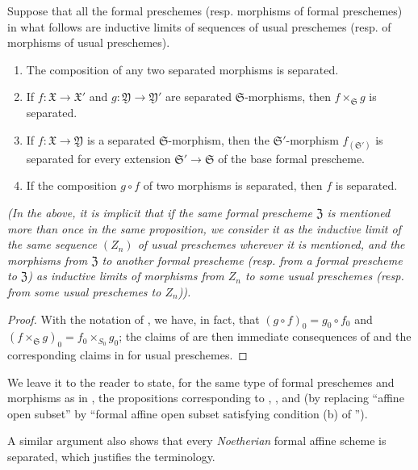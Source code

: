 \begin{proposition}[10.15.3]
\label{I.10.15.3}
Suppose that all the formal preschemes (resp. morphisms of formal preschemes) in what follows are inductive limits of sequences of usual preschemes (resp. of morphisms of usual preschemes).
\begin{enumerate}
    \item[\rm{(i)}] The composition of any two separated morphisms is separated.
    \item[\rm{(ii)}] If $f:\mathfrak{X}\to\mathfrak{X}'$ and $g:\mathfrak{Y}\to\mathfrak{Y}'$ are separated $\mathfrak{S}$-morphisms, then $f\times_\mathfrak{S}g$ is separated.
    \item[\rm{(iii)}] If $f:\mathfrak{X}\to\mathfrak{Y}$ is a separated $\mathfrak{S}$-morphism, then the $\mathfrak{S}'$-morphism $f_{(\mathfrak{S}')}$ is separated for every extension $\mathfrak{S}'\to\mathfrak{S}$ of the base formal prescheme.
    \item[\rm{(iv)}] If the composition $g\circ f$ of two morphisms is separated, then $f$ is separated.
\end{enumerate}
\emph{(In the above, it is implicit that if the same formal prescheme $\mathfrak{Z}$ is mentioned more than once in the same proposition, we consider it as the inductive limit of the \emph{same} sequence $(Z_n)$ of usual preschemes wherever it is mentioned, and the morphisms from $\mathfrak{Z}$ to another formal prescheme (resp. from a formal prescheme to $\mathfrak{Z}$) as inductive limits of morphisms from $Z_n$ to some usual preschemes (resp. from some usual preschemes to $Z_n$)).}
\end{proposition}

\begin{proof}
With the notation of , we have, in fact, that $(g\circ f)_0=g_0\circ f_0$ and $(f\times_\mathfrak{S}g)_0=f_0\times_{S_0}g_0$;
the claims of  are then immediate consequences of  and the corresponding claims in  for usual preschemes.
\end{proof}

We leave it to the reader to state, for the same type of formal preschemes and morphisms as in , the propositions corresponding to ,
, and  (by replacing ``affine open subset'' by ``formal affine open subset satisfying condition (b) of '').

A similar argument also shows that every \emph{Noetherian} formal affine scheme is separated, which justifies the terminology.

